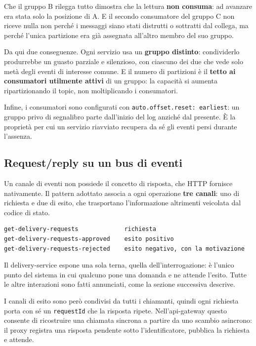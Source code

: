 \documentclass[12pt,a4paper]{article}
\begin{document}
Che il gruppo B rilegga tutto dimostra che la lettura \textbf{non consuma}: ad avanzare era stata
solo la posizione di A. E il secondo consumatore del gruppo C non riceve nulla non perch\'e i
messaggi siano stati distrutti o sottratti dal collega, ma perch\'e l'unica partizione era gi\`a
assegnata all'altro membro del suo gruppo.

Da qui due conseguenze. Ogni servizio usa un \textbf{gruppo distinto}: condividerlo produrrebbe un
guasto parziale e silenzioso, con ciascuno dei due che vede solo met\`a degli eventi di interesse
comune. E il numero di partizioni \`e il \textbf{tetto ai consumatori utilmente attivi} di un
gruppo: la capacit\`a si aumenta ripartizionando il topic, non moltiplicando i consumatori.

Infine, i consumatori sono configurati con \texttt{auto.offset.reset: earliest}: un gruppo privo di
segnalibro parte dall'inizio del log anzich\'e dal presente. \`E la propriet\`a per cui un servizio
riavviato recupera da s\'e gli eventi persi durante l'assenza.

\subsection{Request/reply su un bus di eventi}

Un canale di eventi non possiede il concetto di risposta, che HTTP fornisce nativamente. Il pattern
adottato associa a ogni operazione \textbf{tre canali}: uno di richiesta e due di esito, che
trasportano l'informazione altrimenti veicolata dal codice di stato.

\begin{lstlisting}[caption={La terna di canali per l'interrogazione di una consegna}]
get-delivery-requests             richiesta
get-delivery-requests-approved    esito positivo
get-delivery-requests-rejected    esito negativo, con la motivazione
\end{lstlisting}

Il delivery-service espone una sola terna, quella dell'interrogazione: \`e l'unico punto del
sistema in cui qualcuno pone una domanda e ne attende l'esito. Tutte le altre interazioni sono
fatti annunciati, come la sezione successiva descrive.

I canali di esito sono per\`o condivisi da tutti i chiamanti, quindi ogni richiesta porta con s\'e un
\texttt{requestId} che la risposta ripete. Nell'api-gateway questo consente di ricostruire una
chiamata sincrona a partire da uno scambio asincrono: il proxy registra una risposta pendente sotto
l'identificatore, pubblica la richiesta e attende.
\end{document}
